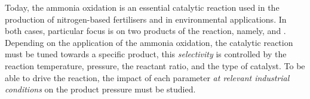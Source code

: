 Today, the ammonia oxidation is an essential catalytic reaction used in the production of nitrogen-based fertilisers and in environmental applications.
In both cases, particular focus is on two products of the reaction, namely,  and .
Depending on the application of the ammonia oxidation, the catalytic reaction must be tuned towards a specific product, this \textit{selectivity} is controlled by the reaction temperature, pressure, the  reactant ratio, and the type of catalyst.
To be able to drive the reaction, the impact of each parameter \textit{at relevant industrial conditions} on the product pressure must be studied.

\begin{landscape}
\begin{table}[!htb]
\centering
{}
\end{table}
\end{landscape}
